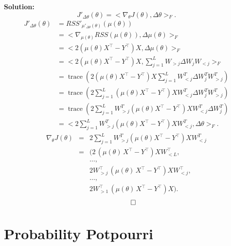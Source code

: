 \documentclass{article}
\newcommand{\Question}[1]{\Large \section{ #1 } \normalsize}
\DeclareMathOperator{\trac}{\mathrm{trace}}
\newenvironment{solution}{\color{blue} \smallskip \textbf{Solution:}}{}
\begin{document}
\begin{enumerate}
    \begin{solution}
        $$
        J'_{\Delta \theta}(\theta) = <\nabla_\theta J(\theta), \Delta \theta>_F.
        $$
        \begin{align*}
        J'_{\Delta \theta}(\theta) &= RSS'_{\mu'_{\Delta \theta}(\theta)}(\mu(\theta)) \\
        &= <\nabla_{\mu(\theta)} RSS(\mu(\theta)), \Delta \mu(\theta)>_F \\
        &= <2(\mu(\theta)X^\top - Y^\top)X, \Delta \mu(\theta)>_F \\
        &= <2(\mu(\theta)X^\top - Y^\top)X, \sum_{j=1}^L W_{>j} \Delta W_j W_{<j}>_F \\
        &= \trac(2(\mu(\theta)X^\top - Y^\top)X\sum_{j=1}^L W^T_{<j} \Delta W^T_j W^T_{>j}) \\
        &= \trac(2\sum_{j=1}^L(\mu(\theta)X^\top - Y^\top)X W^T_{<j} \Delta W^T_j W^T_{>j}) \\
        &= \trac(2\sum_{j=1}^L W^T_{>j}(\mu(\theta)X^\top - Y^\top)X W^T_{<j} \Delta W^T_j) \\
        &= <2\sum_{j=1}^L W^T_{>j}(\mu(\theta)X^\top - Y^\top)X W^T_{<j}, \Delta \theta>_F.
        \end{align*}
        \begin{eqnarray*}
        \nabla_\theta J(\theta) & = & 2\sum_{j=1}^L W^T_{>j}(\mu(\theta)X^\top - Y^\top)X W^T_{<j} \\
                            & = & (2 \, (\mu(\theta)\, X^\top - Y^\top) X W_{<L}^\top, \\ 
                            &   & \ldots, \\
                            &   & 2 W_{>j}^\top \, (\mu(\theta)\, X^\top - Y^\top) X W_{<j}^\top, \\
                            &   & \ldots, \\
                            &   & 2 W_{>1}^\top \, (\mu(\theta)\, X^\top - Y^\top) X).
    \end{eqnarray*}
        \[ \qedhere \]
    \end{solution}

\end{enumerate}

\newpage
\Question{Probability Potpourri}
\end{document}
